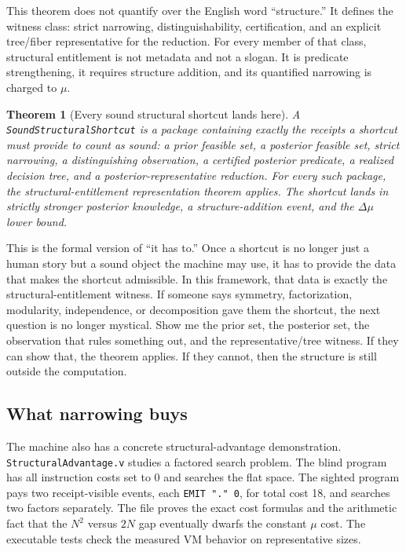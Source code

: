 \documentclass[11pt,a4paper]{article}
\theoremstyle{plain}
\newtheorem{theorem}{Theorem}[section]
\theoremstyle{definition}
\theoremstyle{remark}
\begin{document}
This theorem does not quantify over the English word ``structure.'' It defines the witness class: strict narrowing, distinguishability, certification, and an explicit tree/fiber representative for the reduction. For every member of that class, structural entitlement is not metadata and not a slogan. It is predicate strengthening, it requires structure addition, and its quantified narrowing is charged to $\mu$.

\begin{theorem}[Every sound structural shortcut lands here]
A \texttt{SoundStructuralShortcut} is a package containing exactly the receipts a shortcut must provide to count as sound: a prior feasible set, a posterior feasible set, strict narrowing, a distinguishing observation, a certified posterior predicate, a realized decision tree, and a posterior-representative reduction. For every such package, the structural-entitlement representation theorem applies. The shortcut lands in strictly stronger posterior knowledge, a structure-addition event, and the $\Delta\mu$ lower bound.
\end{theorem}

This is the formal version of ``it has to.'' Once a shortcut is no longer just a human story but a sound object the machine may use, it has to provide the data that makes the shortcut admissible. In this framework, that data is exactly the structural-entitlement witness. If someone says symmetry, factorization, modularity, independence, or decomposition gave them the shortcut, the next question is no longer mystical. Show me the prior set, the posterior set, the observation that rules something out, and the representative/tree witness. If they can show that, the theorem applies. If they cannot, then the structure is still outside the computation.

\subsection{What narrowing buys}

The machine also has a concrete structural-advantage demonstration. \texttt{StructuralAdvantage.v} studies a factored search problem. The blind program has all instruction costs set to 0 and searches the flat space. The sighted program pays two receipt-visible events, each \texttt{EMIT "." 0}, for total cost 18, and searches two factors separately. The file proves the exact cost formulas and the arithmetic fact that the $N^2$ versus $2N$ gap eventually dwarfs the constant $\mu$ cost. The executable tests check the measured VM behavior on representative sizes.
\end{document}
